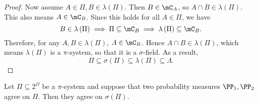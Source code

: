 \documentclass[stat901]{subfiles}
\begin{document}
\begin{proof}
        Now assume $A\in\Pi, B\in\lambda\left( \Pi \right)$. Then $B\in\mC_A$, so $A\cap B\in\lambda\left( \Pi \right)$. This also means $A\in\mC_B$. Since this holds for all $A\in\Pi$, we have
        \begin{equation*}
            B\in\lambda\left( \Pi \right) \implies \Pi\subseteq\mC_B \implies \lambda\left( \Pi \right)\subseteq\mC_B.
        \end{equation*}
        Therefore, for any $A,B\in\lambda\left( \Pi \right)$, $A\in\mC_B$. Hence $A\cap B\in\lambda\left( \Pi \right)$, which means $\lambda\left( \Pi \right)$ is a $\pi$-system, so that it is a $\sigma$-field. As a result,
        \begin{equation*}
            \Pi \subseteq\sigma\left( \Pi \right)\subseteq\lambda\left( \Pi \right)\subseteq\Lambda.
        \end{equation*}
    \end{proof}

    \begin{cor}{}
        Let $\Pi\subseteq 2^{\Omega}$ be a $\pi$-system and suppose that two probability measures $\PP_1,\PP_2$ agree on $\Pi$. Then they agree on $\sigma\left( \Pi \right)$.
    \end{cor}	
\end{document}
